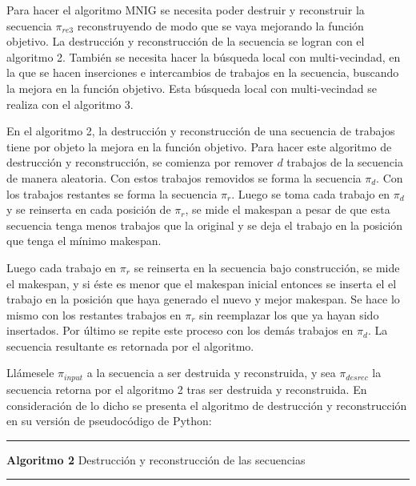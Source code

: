 \documentclass{article}
\begin{document}
\vspace{\baselineskip}
Para hacer el algoritmo MNIG se necesita poder destruir y reconstruir la secuencia $\pi_{re3}$ reconstruyendo de modo que se vaya mejorando la función objetivo. La destrucción y reconstrucción de la secuencia se logran con el algoritmo 2. También se necesita hacer la búsqueda local con multi-vecindad, en la que se hacen inserciones e intercambios de trabajos en la secuencia, buscando la mejora en la función objetivo. Esta búsqueda local con multi-vecindad se realiza con el algoritmo 3. \autocite{algMNIG}

\vspace{\baselineskip}
En el algoritmo 2, la destrucción y reconstrucción de una secuencia de trabajos tiene por objeto la mejora en la función objetivo. Para hacer este algoritmo de destrucción y reconstrucción, se comienza por remover $d$ trabajos de la secuencia de manera aleatoria. Con estos trabajos removidos se forma la secuencia $\pi_{d}$. Con los trabajos restantes se forma la secuencia $\pi_{r}$. Luego se toma cada trabajo en $\pi_{d}$ y se reinserta en cada posición de $\pi_{r}$, se mide el makespan a pesar de que esta secuencia tenga menos trabajos que la original y se deja el trabajo en la posición que tenga el mínimo makespan. \autocite{algMNIG}

\vspace{\baselineskip}
Luego cada trabajo en $\pi_{r}$ se reinserta en la secuencia bajo construcción, se mide el makespan, y si éste es menor que el makespan inicial entonces se inserta el el trabajo en la posición que haya generado el nuevo y mejor makespan. Se hace lo mismo con los restantes trabajos en $\pi_{r}$ sin reemplazar los que ya hayan sido insertados. Por último se repite este proceso con los demás trabajos en $\pi_{d}$. La secuencia resultante es retornada por el algoritmo. \autocite{algMNIG}

\vspace{\baselineskip}
Llámesele $\pi_{input}$ a la secuencia a ser destruida y reconstruida, y sea $\pi_{desrec}$ la secuencia retorna por el algoritmo 2 tras ser destruida y reconstruida. En consideración de lo dicho se presenta el algoritmo de destrucción y reconstrucción en su versión de pseudocódigo de Python:

\noindent\noindent
\rule{\linewidth}{0.4pt}

\textbf{Algoritmo 2} Destrucción y reconstrucción de las secuencias

\noindent\noindent
\rule{\linewidth}{0.4pt}
\end{document}
